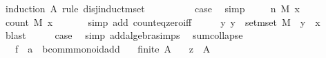 \begin{isabellebody}
%
\isadelimproof
%
\endisadelimproof
%
\isatagproof
{}\isamarkupfalse%
\ {\isacharparenleft}{\kern0pt}induction\ A\ rule{\isacharcolon}{\kern0pt}\ disj{\isacharunderscore}{\kern0pt}induct{\isacharunderscore}{\kern0pt}mset{\isacharparenright}{\kern0pt}\isanewline
\ \ \isamarkupfalse%
\ {}\isanewline
\ \ \isamarkupfalse%
\ \isamarkupfalse%
\ {\isacharquery}{\kern0pt}case\ \isamarkupfalse%
\ simp\isanewline
{}\isamarkupfalse%
\isanewline
\ \ \isamarkupfalse%
\ {\isacharparenleft}{\kern0pt}{}\ n\ M\ x{\isacharparenright}{\kern0pt}\isanewline
\ \ \isamarkupfalse%
\ \isamarkupfalse%
\ {\isachardoublequoteopen}count\ M\ x\ {\isacharequal}{\kern0pt}\ {}{\isachardoublequoteclose}\ \isamarkupfalse%
\ {}\ \isamarkupfalse%
\ {\isacharparenleft}{\kern0pt}simp\ add{\isacharcolon}{\kern0pt}\ count{\isacharunderscore}{\kern0pt}eq{\isacharunderscore}{\kern0pt}zero{\isacharunderscore}{\kern0pt}iff{\isacharparenright}{\kern0pt}\isanewline
\ \ \isamarkupfalse%
\ \isamarkupfalse%
\ {\isachardoublequoteopen}{\isasymAnd}y{\isachardot}{\kern0pt}\ y\ {\isasymin}\ set{\isacharunderscore}{\kern0pt}mset\ M\ {\isasymLongrightarrow}\ y\ {\isasymnoteq}\ x{\isachardoublequoteclose}\ \isamarkupfalse%
\ {}\ \isamarkupfalse%
\ blast\isanewline
\ \ \isamarkupfalse%
\ \isamarkupfalse%
\ {\isacharquery}{\kern0pt}case\ \isamarkupfalse%
\ {\isacharparenleft}{\kern0pt}simp\ add{\isacharcolon}{\kern0pt}algebra{\isacharunderscore}{\kern0pt}simps{\isacharparenright}{\kern0pt}\ \isanewline
{}\isamarkupfalse%
%
\endisatagproof
{\isafoldproof}%
%
\isadelimproof
\isanewline
%
\endisadelimproof
\isanewline
{}\isamarkupfalse%
\ sum{\isacharunderscore}{\kern0pt}collapse{\isacharcolon}{\kern0pt}\ \isanewline
\ \ \ f\ {\isacharcolon}{\kern0pt}{\isacharcolon}{\kern0pt}\ {\isachardoublequoteopen}{\isacharprime}{\kern0pt}a\ {\isasymRightarrow}\ {\isacharprime}{\kern0pt}b{\isacharcolon}{\kern0pt}{\isacharcolon}{\kern0pt}{\isacharbraceleft}{\kern0pt}comm{\isacharunderscore}{\kern0pt}monoid{\isacharunderscore}{\kern0pt}add{\isacharbraceright}{\kern0pt}{\isachardoublequoteclose}\isanewline
\ \ \ {\isachardoublequoteopen}finite\ A{\isachardoublequoteclose}\isanewline
\ \ \ {\isachardoublequoteopen}z\ {\isasymin}\ A{\isachardoublequoteclose}\isanewline

\end{isabellebody}

